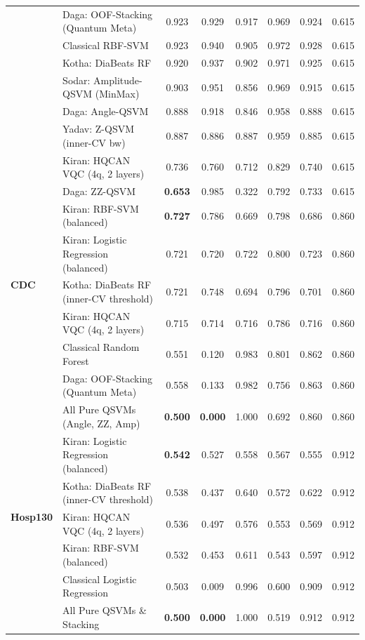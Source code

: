 \documentclass[11pt,a4paper]{article}
\newcommand{\BAD}[1]{\textcolor{bad}{\textbf{#1}}}
\begin{document}
\begin{table}[H]
\begin{tabular}{llcccccc}
& Daga: OOF-Stacking (Quantum Meta) & 0.923 & 0.929 & 0.917 & 0.969 & 0.924 & 0.615 \\
& Classical RBF-SVM & 0.923 & 0.940 & 0.905 & 0.972 & 0.928 & 0.615 \\
& Kotha: DiaBeats RF & 0.920 & 0.937 & 0.902 & 0.971 & 0.925 & 0.615 \\
& Sodar: Amplitude-QSVM (MinMax) & 0.903 & 0.951 & 0.856 & 0.969 & 0.915 & 0.615 \\
& Daga: Angle-QSVM & 0.888 & 0.918 & 0.846 & 0.958 & 0.888 & 0.615 \\
& Yadav: Z-QSVM (inner-CV bw) & 0.887 & 0.886 & 0.887 & 0.959 & 0.885 & 0.615 \\
& Kiran: HQCAN VQC (4q, 2 layers) & 0.736 & 0.760 & 0.712 & 0.829 & 0.740 & 0.615 \\
& Daga: ZZ-QSVM & \BAD{0.653} & 0.985 & 0.322 & 0.792 & 0.733 & 0.615 \\
\midrule
\multirow{5}{*}{\textbf{CDC}} 
& Kiran: RBF-SVM (balanced) & \textbf{0.727} & 0.786 & 0.669 & 0.798 & 0.686 & 0.860 \\
& Kiran: Logistic Regression (balanced) & 0.721 & 0.720 & 0.722 & 0.800 & 0.723 & 0.860 \\
& Kotha: DiaBeats RF (inner-CV threshold) & 0.721 & 0.748 & 0.694 & 0.796 & 0.701 & 0.860 \\
& Kiran: HQCAN VQC (4q, 2 layers) & 0.715 & 0.714 & 0.716 & 0.786 & 0.716 & 0.860 \\
& Classical Random Forest & 0.551 & 0.120 & 0.983 & 0.801 & 0.862 & 0.860 \\
& Daga: OOF-Stacking (Quantum Meta) & 0.558 & 0.133 & 0.982 & 0.756 & 0.863 & 0.860 \\
& All Pure QSVMs (Angle, ZZ, Amp) & \BAD{0.500} & \BAD{0.000} & 1.000 & 0.692 & 0.860 & 0.860 \\
\midrule
\multirow{5}{*}{\textbf{Hosp130}} 
& Kiran: Logistic Regression (balanced) & \textbf{0.542} & 0.527 & 0.558 & 0.567 & 0.555 & 0.912 \\
& Kotha: DiaBeats RF (inner-CV threshold) & 0.538 & 0.437 & 0.640 & 0.572 & 0.622 & 0.912 \\
& Kiran: HQCAN VQC (4q, 2 layers) & 0.536 & 0.497 & 0.576 & 0.553 & 0.569 & 0.912 \\
& Kiran: RBF-SVM (balanced) & 0.532 & 0.453 & 0.611 & 0.543 & 0.597 & 0.912 \\
& Classical Logistic Regression & 0.503 & 0.009 & 0.996 & 0.600 & 0.909 & 0.912 \\
& All Pure QSVMs \& Stacking & \BAD{0.500} & \BAD{0.000} & 1.000 & 0.519 & 0.912 & 0.912 \\
\bottomrule
\end{tabular}
\end{table}
\end{document}
